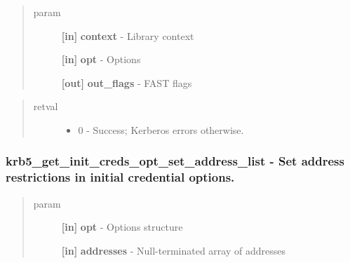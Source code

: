 \documentclass[letterpaper,10pt,english]{sphinxmanual}
\begin{document}
\begin{quote}\begin{description}
\item[{param}] \leavevmode
\textbf{{[}in{]}} \textbf{context} - Library context

\textbf{{[}in{]}} \textbf{opt} - Options

\textbf{{[}out{]}} \textbf{out\_flags} - FAST flags

\end{description}\end{quote}
\begin{quote}\begin{description}
\item[{retval}] \leavevmode\begin{itemize}
\item {} 
0   - Success; Kerberos errors otherwise.

\end{itemize}

\end{description}\end{quote}


\subsubsection{krb5\_get\_init\_creds\_opt\_set\_address\_list -  Set address restrictions in initial credential options.}
\label{appdev/refs/api/krb5_get_init_creds_opt_set_address_list:krb5-get-init-creds-opt-set-address-list-set-address-restrictions-in-initial-credential-options}\label{appdev/refs/api/krb5_get_init_creds_opt_set_address_list::doc}

\begin{fulllineitems}
\label{appdev/refs/api/krb5_get_init_creds_opt_set_address_list:krb5_get_init_creds_opt_set_address_list}
\end{fulllineitems}

\begin{quote}\begin{description}
\item[{param}] \leavevmode
\textbf{{[}in{]}} \textbf{opt} - Options structure

\textbf{{[}in{]}} \textbf{addresses} - Null-terminated array of addresses

\end{description}\end{quote}
\end{document}
